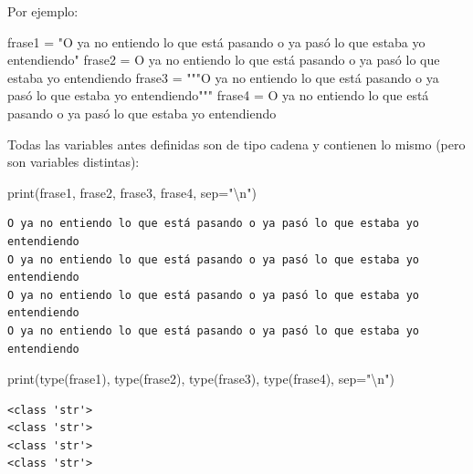 \documentclass[
  spanish,
  letterpaper,
]{scrbook}
\newenvironment{Shaded}{\begin{snugshade}}{\end{snugshade}}
\newcommand{\BuiltInTok}[1]{\textcolor[rgb]{0.00,0.23,0.31}{#1}}
\newcommand{\CharTok}[1]{\textcolor[rgb]{0.13,0.47,0.30}{#1}}
\newcommand{\NormalTok}[1]{\textcolor[rgb]{0.00,0.23,0.31}{#1}}
\newcommand{\OperatorTok}[1]{\textcolor[rgb]{0.37,0.37,0.37}{#1}}
\newcommand{\StringTok}[1]{\textcolor[rgb]{0.13,0.47,0.30}{#1}}
\theoremstyle{definition}
\theoremstyle{remark}
\begin{document}
Por ejemplo:

\begin{Shaded}
\begin{Highlighting}[]
\NormalTok{frase1 }\OperatorTok{=} \StringTok{"O ya no entiendo lo que está pasando o ya pasó lo que estaba yo entendiendo"}
\NormalTok{frase2 }\OperatorTok{=} \StringTok{\textquotesingle{}O ya no entiendo lo que está pasando o ya pasó lo que estaba yo entendiendo\textquotesingle{}}
\NormalTok{frase3 }\OperatorTok{=} \StringTok{"""O ya no entiendo lo que está pasando o ya pasó lo que estaba yo entendiendo"""}
\NormalTok{frase4 }\OperatorTok{=} \StringTok{\textquotesingle{}\textquotesingle{}\textquotesingle{}O ya no entiendo lo que está pasando o ya pasó lo que estaba yo entendiendo\textquotesingle{}\textquotesingle{}\textquotesingle{}}
\end{Highlighting}
\end{Shaded}

Todas las variables antes definidas son de tipo cadena y contienen lo
mismo (pero son variables distintas):

\begin{Shaded}
\begin{Highlighting}[]
\BuiltInTok{print}\NormalTok{(frase1, frase2, frase3, frase4, sep}\OperatorTok{=}\StringTok{"}\CharTok{\textbackslash{}n}\StringTok{"}\NormalTok{)}
\end{Highlighting}
\end{Shaded}

\begin{verbatim}
O ya no entiendo lo que está pasando o ya pasó lo que estaba yo entendiendo
O ya no entiendo lo que está pasando o ya pasó lo que estaba yo entendiendo
O ya no entiendo lo que está pasando o ya pasó lo que estaba yo entendiendo
O ya no entiendo lo que está pasando o ya pasó lo que estaba yo entendiendo
\end{verbatim}

\begin{Shaded}
\begin{Highlighting}[]
\BuiltInTok{print}\NormalTok{(}\BuiltInTok{type}\NormalTok{(frase1), }\BuiltInTok{type}\NormalTok{(frase2), }\BuiltInTok{type}\NormalTok{(frase3), }\BuiltInTok{type}\NormalTok{(frase4), sep}\OperatorTok{=}\StringTok{"}\CharTok{\textbackslash{}n}\StringTok{"}\NormalTok{)}
\end{Highlighting}
\end{Shaded}

\begin{verbatim}
<class 'str'>
<class 'str'>
<class 'str'>
<class 'str'>
\end{verbatim}
\end{document}
